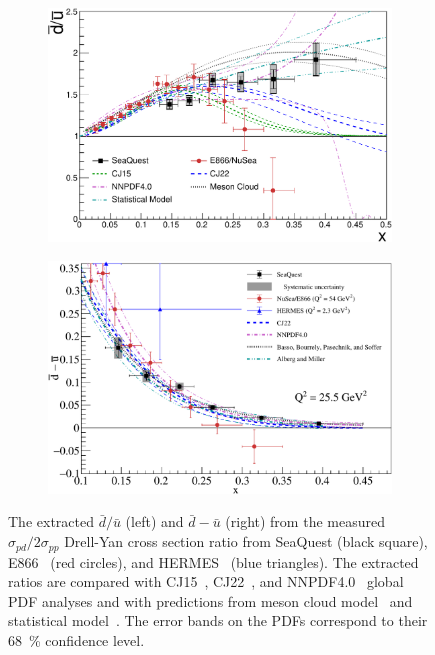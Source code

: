 \documentclass[reprint,aps,unsortedaddress,superscriptaddress,prl,floatfix,showpacs,linenumbers]{revtex4-2}
\begin{document}
\begin{figure}[htpb!]
	\centering
	\begin{subfigure}{0.45\linewidth}
		\includegraphics[width=\linewidth]{E906_E866_dbarubar_PDF_model.pdf}
	\end{subfigure}
	\begin{subfigure}{0.45\linewidth}
		\includegraphics[width=\linewidth]{dbub_diff.pdf}
	\end{subfigure}
	\caption{The extracted $\bar{d}/\bar{u}$ (left) and $\bar{d}-\bar{u}$ (right)
		from the measured $\sigma_{pd}/2\sigma_{pp}$ Drell-Yan cross section ratio
		from SeaQuest (black square), E866~\cite{towell2001} (red circles), and HERMES~\cite{ackerstaff1998} (blue triangles).
		The extracted ratios are compared with CJ15~\cite{accardi2016a}, CJ22~\cite{accardi2023}, and NNPDF4.0~\cite{ball2022a} global PDF analyses
		and with predictions from meson cloud model~\cite{alberg2022} and statistical model~\cite{soffer2019}.
		The error bands on the PDFs correspond to their \SI{68}{\percent} confidence level.
	}
	\label{fig:e906_e866_dbarubar}
\end{figure}
\end{document}
